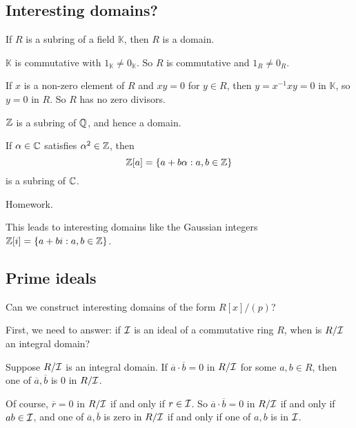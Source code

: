 \documentclass[12pt,letterpaper]{report}
\begin{document}
\pagebreak
\subsection{Interesting domains?}

\begin{prop}{}{}
  If $R$ is a subring of a field $\mathbb{K}$, then $R$ is a domain.
\end{prop}

\begin{thmproof}
  $\mathbb{K}$ is commutative with $1_{\mathbb{K}} \neq 0_{\mathbb{K}}$.
  So $R$ is commutative and $1_R \neq 0_R$.

  If $x$ is a non-zero element of $R$ and $xy = 0$ for $y \in R$, then $y = x^{-1}xy = 0$ in
  $\mathbb{K}$, so $y = 0$ in $R$.
  So $R$ has no zero divisors.
\end{thmproof}

\begin{ex}
  $\mathbb{Z}$ is a subring of $\mathbb{Q}$, and hence a domain.
\end{ex}

\begin{prop}{}{}
  If $\alpha \in \mathbb{C}$ satisfies $\alpha^2 \in \mathbb{Z}$, then
  \[ \mathbb{Z}[a] = \{a + b\alpha : a, b \in \mathbb{Z}\} \]
  is a subring of $\mathbb{C}$.
\end{prop}

\begin{thmproof}
  Homework.
\end{thmproof}

This leads to interesting domains like the Gaussian integers $\mathbb{Z}[i] = \{a + bi : a, b \in \mathbb{Z}\}$.

\pagebreak
\subsection{Prime ideals}

Can we construct interesting domains of the form $R[x]/(p)$?

First, we need to answer: if $\mathcal{I}$ is an ideal of a commutative ring $R$, when is $R/\mathcal{I}$ an
integral domain?

Suppose $R/\mathcal{I}$ is an integral domain.
If $\overline{a} \cdot \overline{b} = 0$ in $R/\mathcal{I}$ for some $a, b \in R$, then one of
$\overline{a}, \overline{b}$ is 0 in $R/\mathcal{I}$.

Of course, $\overline{r} = 0$ in $R/\mathcal{I}$ if and only if $r \in \mathcal{I}$.
So $\overline{a} \cdot \overline{b} = 0$ in $R/\mathcal{I}$ if and only if $ab \in \mathcal{I}$, and one of
$\overline{a}, \overline{b}$ is zero in $R/\mathcal{I}$ if and only if one of $a, b$ is in $\mathcal{I}$.
\end{document}
